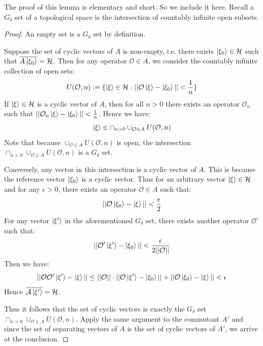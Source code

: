 \documentclass[a4paper,11pt]{article}
\theoremstyle{definition}
\begin{document}
The proof of this lemma is elementary and short. So we include it here. Recall a $G_\delta$ set of a topological space is the intersection of countably infinite open subsets. 
\begin{proof}
    An empty set is a $G_\delta$ set by definition.

    Suppose the set of cyclic vectors of $A$ is non-empty, i.e. there exists $\ket{\xi_0}\in \mathcal{H}$ such that $\overline{A\ket{\xi_0}}= \mathcal{H}$. Then for any operator $\mathcal{O}\in A$, we consider the countably infinite collection of open sets:
    \begin{equation}
        U(\mathcal{O},n):=\{\ket{\xi}\in\mathcal{H}:||\mathcal{O}\ket{\xi} - \ket{\xi_0}|| < \frac{1}{n}\}
    \end{equation}
    If $\ket{\xi}\in\mathcal{H}$ is a cyclic vector of $A$, then for all $n > 0$ there exists an operator $\mathcal{O}_n$ such that $||\mathcal{O}_n\ket{\xi} - \ket{\xi_0}|| < \frac{1}{n}$. Hence we have:
    \begin{equation}
        \ket{\xi}\in \cap_{n > 0}\cup_{\mathcal{O}\in A}U(\mathcal{O}, n)
    \end{equation}
    Note that because $\cup_{\mathcal{O}\in A} U(\mathcal{O}, n)$ is open, the intersection $\cap_{n > 0}\cup_{\mathcal{O}\in A}U(\mathcal{O}, n)$ is a $G_\delta$ set. 
    
    Conversely, any vector in this intersection is a cyclic vector of $A$. This is because the reference vector $\ket{\xi_0}$ is a cyclic vector. Thus for an arbitrary vector $\ket{\xi}\in\mathcal{H}$ and for any $\epsilon  > 0$, there exists an operator $\mathcal{O}\in A$ such that:
    \begin{equation}
        ||\mathcal{O}\ket{\xi_0} - \ket{\xi}|| < \frac{\epsilon}{2}
    \end{equation}
    For any vector $\ket{\xi'}$ in the aforementioned $G_\delta$ set, there exists another operator $\mathcal{O}'$ such that:
    \begin{equation}
        ||\mathcal{O}'\ket{\xi'
        } - \ket{\xi_0}|| < \frac{\epsilon}{2 ||\mathcal{O}||}
    \end{equation}
    Then we have:
    \begin{equation}
        ||\mathcal{O}\mathcal{O}'\ket{\xi'} - \ket{\xi}||\leq||\mathcal{O}||\cdot||\mathcal{O}\ket{\xi'} - \ket{\xi_0}|| + ||\mathcal{O}\ket{\xi_0} - \ket{\xi}|| <\epsilon
    \end{equation}
    Hence $\overline{\mathcal{A}\ket{\xi'}} = \mathcal{H}$. 

    Thus it follows that the set of cyclic vectors is exactly the $G_\delta$ set $\cap_{n >0}\cup_{\mathcal{O}\in A}U(\mathcal{O},n)$. Apply the same argument to the commutant $A'$ and since the set of separating vectors of $A$ is the set of cyclic vectors of $A'$, we arrive at the conclusion.
\end{proof}
\end{document}
